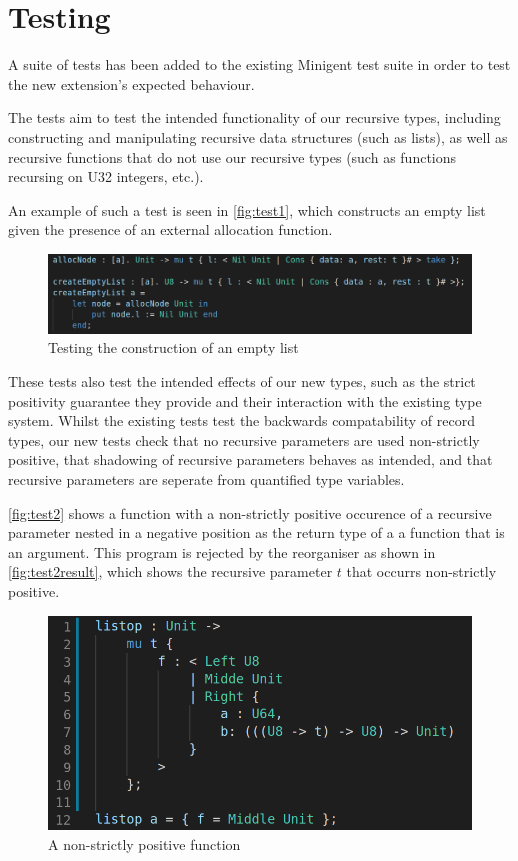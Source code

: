 \section{Testing}

A suite of tests has been added to the existing Minigent test suite in order to test the new extension's 
expected behaviour.

The tests aim to test the intended functionality of our recursive types, including constructing and manipulating
recursive data structures (such as lists), as well as recursive functions that do not use our recursive types 
(such as functions recursing on U32 integers, etc.).

An example of such a test is seen in \autoref{fig:test1}, which constructs an empty list given the presence
of an external allocation function.

\begin{figure}
    \centering
    \includegraphics[width=\linewidth]{content/test1.png}
    \caption{Testing the construction of an empty list }
    \label{fig:test1}
\end{figure}

These tests also test the intended effects of our new types, such as the strict positivity guarantee they provide
and their interaction with the existing type system. Whilst the existing tests test the backwards compatability of
record types, our new tests check that no recursive parameters are used non-strictly positive, that shadowing of recursive
parameters behaves as intended, and that recursive parameters are seperate from quantified type variables.

\autoref{fig:test2} shows a function with a non-strictly positive occurence of a recursive parameter nested in 
a negative position as the return type of a a function that is an argument. This program is rejected by the reorganiser
as shown in \autoref{fig:test2result}, which shows the recursive parameter $t$ that occurrs non-strictly positive.

\begin{figure}
    \centering
    \includegraphics[width=0.8\linewidth]{content/test2.png}
    \caption{A non-strictly positive function}
    \label{fig:test2}
\end{figure}

